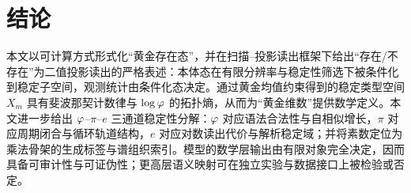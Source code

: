 \section{结论}

本文以可计算方式形式化“黄金存在态”，并在扫描--投影读出框架下给出“存在/不存在”为二值投影读出的严格表述：本体态在有限分辨率与稳定性筛选下被条件化到稳定子空间，观测统计由条件化态决定。通过黄金均值约束得到的稳定类型空间 $X_m$ 具有斐波那契计数律与 $\log\varphi$ 的拓扑熵，从而为“黄金维数”提供数学定义。本文进一步给出 $\varphi$--$\pi$--$e$ 三通道稳定性分解：$\varphi$ 对应语法合法性与自相似增长，$\pi$ 对应周期闭合与循环轨道结构，$e$ 对应对数读出代价与解析稳定域；并将素数定位为乘法骨架的生成标签与谱组织索引。模型的数学层输出由有限对象完全决定，因而具备可审计性与可证伪性；更高层语义映射可在独立实验与数据接口上被检验或否定。

